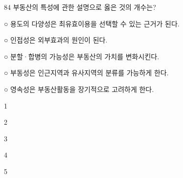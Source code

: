 \begin{question}{84}
부동산의 특성에 관한 설명으로 옳은 것의 개수는?
\begin{framedtext}
○ 용도의 다양성은 최유효이용을 선택할 수 있는 근거가 된다. \par
○ 인접성은 외부효과의 원인이 된다. \par
○ 분할·합병의 가능성은 부동산의 가치를 변화시킨다. \par
○ 부동성은 인근지역과 유사지역의 분류를 가능하게 한다. \par
○ 영속성은 부동산활동을 장기적으로 고려하게 한다.
\end{framedtext}
\begin{choices}
  \item 1
  \item 2
  \item 3
  \item 4
  \item 5
\end{choices}
\end{question}
